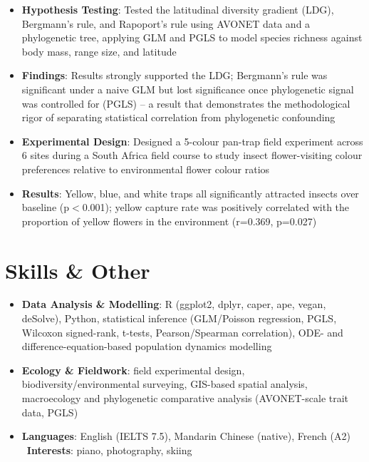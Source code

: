 \documentclass{my-resume}
\begin{document}
\begin{itemize}[parsep=0.2ex]
  \item \textbf{Hypothesis Testing}: Tested the latitudinal diversity gradient (LDG), Bergmann's rule, and Rapoport's rule using AVONET data and a phylogenetic tree, applying GLM and PGLS to model species richness against body mass, range size, and latitude
  \item \textbf{Findings}: Results strongly supported the LDG; Bergmann's rule was significant under a naive GLM but lost significance once phylogenetic signal was controlled for (PGLS) -- a result that demonstrates the methodological rigor of separating statistical correlation from phylogenetic confounding
\end{itemize}

\begin{itemize}[parsep=0.2ex]
  \item \textbf{Experimental Design}: Designed a 5-colour pan-trap field experiment across 6 sites during a South Africa field course to study insect flower-visiting colour preferences relative to environmental flower colour ratios
  \item \textbf{Results}: Yellow, blue, and white traps all significantly attracted insects over baseline (p$<$0.001); yellow capture rate was positively correlated with the proportion of yellow flowers in the environment (r=0.369, p=0.027)
\end{itemize}

\section{Skills \& Other}
\entrySkillsSep
\begin{itemize}[parsep=0.2ex]
  \item \textbf{Data Analysis \& Modelling}: R (ggplot2, dplyr, caper, ape, vegan, deSolve), Python, statistical inference (GLM/Poisson regression, PGLS, Wilcoxon signed-rank, t-tests, Pearson/Spearman correlation), ODE- and difference-equation-based population dynamics modelling
  \item \textbf{Ecology \& Fieldwork}: field experimental design, biodiversity/environmental surveying, GIS-based spatial analysis, macroecology and phylogenetic comparative analysis (AVONET-scale trait data, PGLS)
  \item \textbf{Languages}: English (IELTS 7.5), Mandarin Chinese (native), French (A2) \textbar\ \textbf{Interests}: piano, photography, skiing
\end{itemize}
\end{document}
